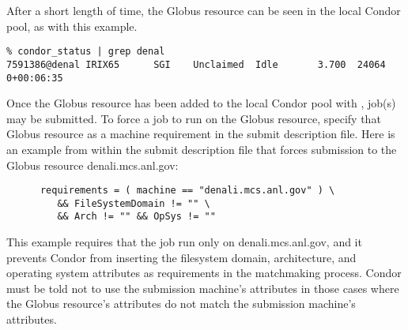 After a short length of time,
the Globus resource can be seen in the local Condor pool,
as with this example.

\begin{verbatim}
% condor_status | grep denal
7591386@denal IRIX65      SGI    Unclaimed  Idle       3.700  24064  0+00:06:35
\end{verbatim}

Once the Globus resource has been added to the local Condor
pool with ,
job(s) may be submitted.
To force a job to run on the Globus resource,
specify that Globus resource as a machine requirement
in the submit description file. 
Here is an example from within the submit description file
that forces submission to the Globus resource denali.mcs.anl.gov:
\begin{verbatim}
      requirements = ( machine == "denali.mcs.anl.gov" ) \
         && FileSystemDomain != "" \
         && Arch != "" && OpSys != ""
\end{verbatim}
This example requires that the job run only on denali.mcs.anl.gov,
and it prevents Condor from inserting the filesystem domain,
architecture, and operating system attributes as requirements
in the matchmaking process.
Condor must be told not to use the submission machine's
attributes in those cases
where the Globus resource's attributes
do not match the submission machine's attributes.
